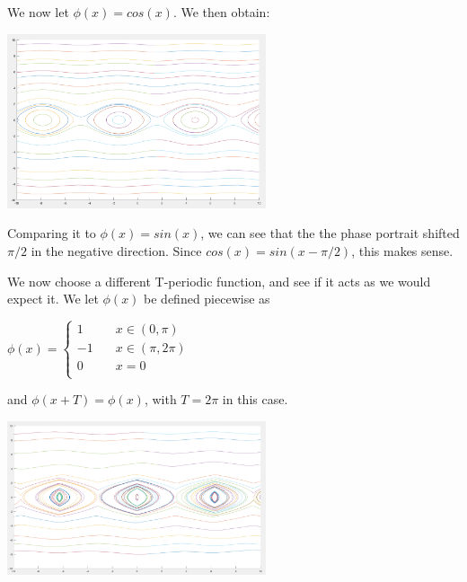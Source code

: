 \documentclass{article}
\begin{document}
\newpage
We now let $\phi(x) = cos(x)$. We then obtain:
\linebreak

\centering
\includegraphics[width=3in]{cos_x.png}
\linebreak

\raggedright
Comparing it to $\phi(x) = sin(x)$, we can see that the the phase portrait shifted $\pi/2$ in the negative direction. Since $cos(x) = sin(x - \pi/2)$, this makes sense. 

\vspace{5mm}

We now choose a different T-periodic function, and see if it acts as we would expect it. We let $\phi(x)$ be defined piecewise as
\linebreak

\centering
$
\phi(x) = 
\left\{
    \begin{array}{ll}
        1 & \quad x \in (0, \pi) \\
        -1 & \quad x \in (\pi, 2\pi) \\
        0 & \quad x = 0 \\
    \end{array}
\right.
$
\linebreak

\raggedright
and $\phi(x + T) = \phi(x)$, with $T = 2\pi$ in this case. 

\vspace{5mm}
\centering
\includegraphics[width=3in]{piecewise.png}
\linebreak
\end{document}
